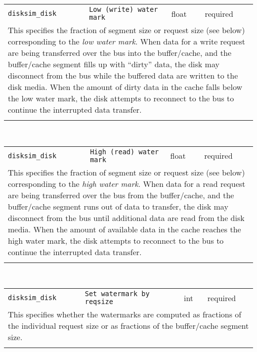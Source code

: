 \noindent 
\begin{tabular}{|p{\lpmodwidth}|p{\lpnamewidth}|p{0.5in}|p{0.5in}|}
\cline{1-4}
\texttt{disksim\_disk} & \texttt{Low (write) water mark} & float & required \\ 
\cline{1-4}
\multicolumn{4}{|p{6in}|}{
This specifies the fraction of segment size or request size (see below)
corresponding to the {\it low water mark}. When data for a write
request are being transferred over the bus into the buffer/cache, and
the buffer/cache segment fills up with ``dirty'' data, the disk may
disconnect from the bus while the buffered data are written to the
disk media. When the amount of dirty data in the cache falls below
the low water mark, the disk attempts to reconnect to the bus to
continue the interrupted data transfer.
}\\ 
\cline{1-4}
\multicolumn{4}{p{5in}}{}\\
\end{tabular}\\ 
\noindent 
\begin{tabular}{|p{\lpmodwidth}|p{\lpnamewidth}|p{0.5in}|p{0.5in}|}
\cline{1-4}
\texttt{disksim\_disk} & \texttt{High (read) water mark} & float & required \\ 
\cline{1-4}
\multicolumn{4}{|p{6in}|}{
This specifies the fraction of
segment size or request size (see below) corresponding to the
{\it high water mark}. When data for a read request are being transferred
over the bus from the buffer/cache, and the buffer/cache segment runs out of
data to transfer, the disk may disconnect from the bus until additional data
are read from the disk media. When the amount of available data in the cache
reaches the high water mark, the disk attempts to reconnect to the bus to
continue the interrupted data transfer.
}\\ 
\cline{1-4}
\multicolumn{4}{p{5in}}{}\\
\end{tabular}\\ 
\noindent 
\begin{tabular}{|p{\lpmodwidth}|p{\lpnamewidth}|p{0.5in}|p{0.5in}|}
\cline{1-4}
\texttt{disksim\_disk} & \texttt{Set watermark by reqsize} & int & required \\ 
\cline{1-4}
\multicolumn{4}{|p{6in}|}{
This specifies whether the
watermarks are computed as fractions of the individual request size
or as fractions of the buffer/cache segment size.
}\\ 
\cline{1-4}
\multicolumn{4}{p{5in}}{}\\
\end{tabular}\\ 
